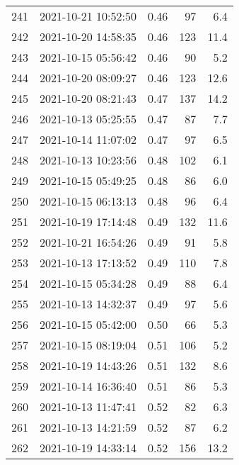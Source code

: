 \begin{tabular}{llrrr}
241 & 2021-10-21 10:52:50 &  0.46 &              97 &                    6.4 \\
242 & 2021-10-20 14:58:35 &  0.46 &             123 &                   11.4 \\
243 & 2021-10-15 05:56:42 &  0.46 &              90 &                    5.2 \\
244 & 2021-10-20 08:09:27 &  0.46 &             123 &                   12.6 \\
245 & 2021-10-20 08:21:43 &  0.47 &             137 &                   14.2 \\
246 & 2021-10-13 05:25:55 &  0.47 &              87 &                    7.7 \\
247 & 2021-10-14 11:07:02 &  0.47 &              97 &                    6.5 \\
248 & 2021-10-13 10:23:56 &  0.48 &             102 &                    6.1 \\
249 & 2021-10-15 05:49:25 &  0.48 &              86 &                    6.0 \\
250 & 2021-10-15 06:13:13 &  0.48 &              96 &                    6.4 \\
251 & 2021-10-19 17:14:48 &  0.49 &             132 &                   11.6 \\
252 & 2021-10-21 16:54:26 &  0.49 &              91 &                    5.8 \\
253 & 2021-10-13 17:13:52 &  0.49 &             110 &                    7.8 \\
254 & 2021-10-15 05:34:28 &  0.49 &              88 &                    6.4 \\
255 & 2021-10-13 14:32:37 &  0.49 &              97 &                    5.6 \\
256 & 2021-10-15 05:42:00 &  0.50 &              66 &                    5.3 \\
257 & 2021-10-15 08:19:04 &  0.51 &             106 &                    5.2 \\
258 & 2021-10-19 14:43:26 &  0.51 &             132 &                    8.6 \\
259 & 2021-10-14 16:36:40 &  0.51 &              86 &                    5.3 \\
260 & 2021-10-13 11:47:41 &  0.52 &              82 &                    6.3 \\
261 & 2021-10-13 14:21:59 &  0.52 &              87 &                    6.2 \\
262 & 2021-10-19 14:33:14 &  0.52 &             156 &                   13.2 \\

\end{tabular}
